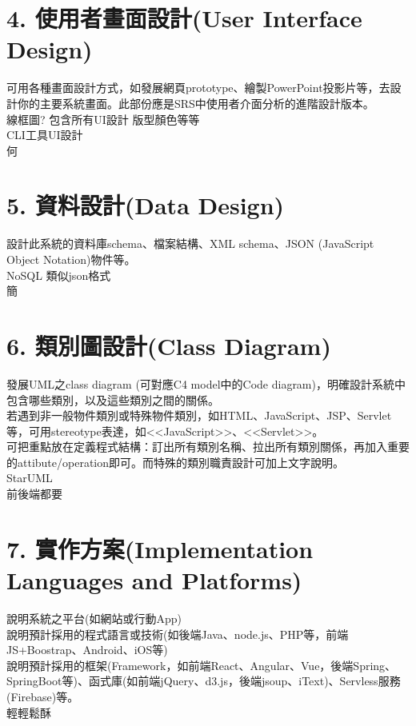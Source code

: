 \documentclass{report}
\begin{document}
\section*{4. 使用者畫面設計(User Interface Design)}

\begin{obeylines}
\parindent=0pt
可用各種畫面設計方式，如發展網頁prototype、繪製PowerPoint投影片等，去設計你的主要系統畫面。此部份應是SRS中使用者介面分析的進階設計版本。
線框圖? 包含所有UI設計 版型顏色等等
CLI工具UI設計
何
\end{obeylines}

\section*{5. 資料設計(Data Design)}

\begin{obeylines}
\parindent=0pt
設計此系統的資料庫schema、檔案結構、XML schema、JSON (JavaScript Object Notation)物件等。
NoSQL 類似json格式
簡
\end{obeylines}

\section*{6. 類別圖設計(Class Diagram)}

\begin{obeylines}
\parindent=0pt
發展UML之class diagram (可對應C4 model中的Code diagram)，明確設計系統中包含哪些類別，以及這些類別之間的關係。
若遇到非一般物件類別或特殊物件類別，如HTML、JavaScript、JSP、Servlet等，可用stereotype表達，如<<JavaScript>>、<<Servlet>>。
可把重點放在定義程式結構：訂出所有類別名稱、拉出所有類別關係，再加入重要的attibute/operation即可。而特殊的類別職責設計可加上文字說明。
	StarUML
	前後端都要
\end{obeylines}

\section*{7. 實作方案(Implementation Languages and Platforms)}

\begin{obeylines}
\parindent=0pt
說明系統之平台(如網站或行動App)
說明預計採用的程式語言或技術(如後端Java、node.js、PHP等，前端JS+Boostrap、Android、iOS等)
說明預計採用的框架(Framework，如前端React、Angular、Vue，後端Spring、SpringBoot等)、函式庫(如前端jQuery、d3.js，後端jsoup、iText)、Servless服務(Firebase)等。
輕輕鬆酥
\end{obeylines}
\end{document}
